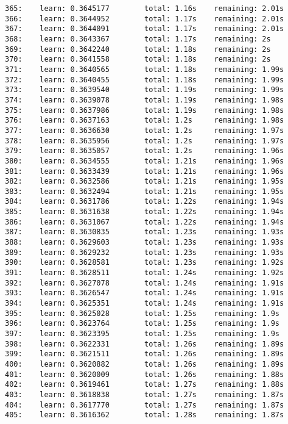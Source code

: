 \documentclass[11pt]{article}
\begin{document}
\begin{Verbatim}[commandchars=\\\{\}]
365:    learn: 0.3645177        total: 1.16s    remaining: 2.01s
366:    learn: 0.3644952        total: 1.17s    remaining: 2.01s
367:    learn: 0.3644091        total: 1.17s    remaining: 2.01s
368:    learn: 0.3643367        total: 1.17s    remaining: 2s
369:    learn: 0.3642240        total: 1.18s    remaining: 2s
370:    learn: 0.3641558        total: 1.18s    remaining: 2s
371:    learn: 0.3640565        total: 1.18s    remaining: 1.99s
372:    learn: 0.3640455        total: 1.18s    remaining: 1.99s
373:    learn: 0.3639540        total: 1.19s    remaining: 1.99s
374:    learn: 0.3639078        total: 1.19s    remaining: 1.98s
375:    learn: 0.3637986        total: 1.19s    remaining: 1.98s
376:    learn: 0.3637163        total: 1.2s     remaining: 1.98s
377:    learn: 0.3636630        total: 1.2s     remaining: 1.97s
378:    learn: 0.3635956        total: 1.2s     remaining: 1.97s
379:    learn: 0.3635057        total: 1.2s     remaining: 1.96s
380:    learn: 0.3634555        total: 1.21s    remaining: 1.96s
381:    learn: 0.3633439        total: 1.21s    remaining: 1.96s
382:    learn: 0.3632586        total: 1.21s    remaining: 1.95s
383:    learn: 0.3632494        total: 1.21s    remaining: 1.95s
384:    learn: 0.3631786        total: 1.22s    remaining: 1.94s
385:    learn: 0.3631638        total: 1.22s    remaining: 1.94s
386:    learn: 0.3631067        total: 1.22s    remaining: 1.94s
387:    learn: 0.3630835        total: 1.23s    remaining: 1.93s
388:    learn: 0.3629603        total: 1.23s    remaining: 1.93s
389:    learn: 0.3629232        total: 1.23s    remaining: 1.93s
390:    learn: 0.3628581        total: 1.23s    remaining: 1.92s
391:    learn: 0.3628511        total: 1.24s    remaining: 1.92s
392:    learn: 0.3627078        total: 1.24s    remaining: 1.91s
393:    learn: 0.3626547        total: 1.24s    remaining: 1.91s
394:    learn: 0.3625351        total: 1.24s    remaining: 1.91s
395:    learn: 0.3625028        total: 1.25s    remaining: 1.9s
396:    learn: 0.3623764        total: 1.25s    remaining: 1.9s
397:    learn: 0.3623395        total: 1.25s    remaining: 1.9s
398:    learn: 0.3622331        total: 1.26s    remaining: 1.89s
399:    learn: 0.3621511        total: 1.26s    remaining: 1.89s
400:    learn: 0.3620882        total: 1.26s    remaining: 1.89s
401:    learn: 0.3620009        total: 1.26s    remaining: 1.88s
402:    learn: 0.3619461        total: 1.27s    remaining: 1.88s
403:    learn: 0.3618838        total: 1.27s    remaining: 1.87s
404:    learn: 0.3617770        total: 1.27s    remaining: 1.87s
405:    learn: 0.3616362        total: 1.28s    remaining: 1.87s

\end{Verbatim}
\end{document}
